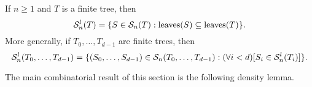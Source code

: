 

\begin{definition}\label{def:subtreeleaves}
  If $n\geq 1$ and $T$ is a finite tree, then%
   \[
     \mathcal{S}^{l}_{n}({T}) = \{S\in\mathcal{S}_{n}({T}): \operatorname{leaves}(S)\subseteq \operatorname{leaves}(T)\}.
   \]
   More generally, if {$T_0, \dots, T_{d-1}$} are finite trees, then
  \[
    \mathcal{S}^{l}_{n}({T_0,\dots,T_{d-1}}) = \{(S_0,\dots, S_{d-1})\in\mathcal{S}_{n}({T_0,\dots,T_{d-1}}): (\forall i<d)[S_i\in \mathcal{S}^{l}_{n}({T_i})]\}.
  \]
\end{definition}

The main combinatorial result of this section is the following density lemma.

